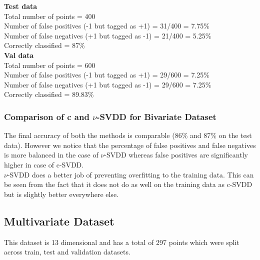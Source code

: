 \documentclass{article}
\begin{document}
\textbf{Test data\\}
Total number of points = 400 \\
Number of false positives (-1 but tagged as +1) = 31/400 = 7.75\%\\ 
Number of false negatives (+1 but tagged as -1) = 21/400 = 5.25\% \\  
Correctly classified = 87\%\\[10pt]
\textbf{Val data\\}
Total number of points = 600 \\
Number of false positives (-1 but tagged as +1) = 29/600 = 7.25\%\\ 
Number of false negatives (+1 but tagged as -1) = 29/600 = 7.25\% \\  
Correctly classified = 89.83\%\\[10pt]


\subsubsection{Comparison of c and $\nu$-SVDD for Bivariate Dataset}
The final accuracy of both the methods is comparable (86\% and 87\% on the test data). However we notice that the percentage of false positives and false negatives is more balanced in the case of $\nu$-SVDD whereas false positives are significantly higher in case of c-SVDD. \\[5pt]$\nu$-SVDD does a better job of preventing overfitting to the training data. This can be seen from the fact that it does not do as well on the training data as c-SVDD but is slightly better everywhere else.

\subsection{Multivariate Dataset}
This dataset is 13 dimensional and has a total of 297 points which were split across train, test and validation datasets. 
\end{document}
